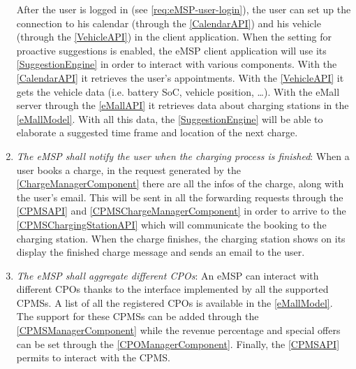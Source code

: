 \begin{enumerate}[label=\textbf{R\arabic*}]
            After the user is logged in (see \ref{req:eMSP-user-login}), the user can set up the connection to his calendar (through the \ref{CalendarAPI}) and his vehicle (through the \ref{VehicleAPI}) in the client application.
            When the setting for proactive suggestions is enabled, the \ac{eMSP} client application will use its \ref{SuggestionEngine} in order to interact with various components. With the \ref{CalendarAPI} it retrieves the user's appointments. With the \ref{VehicleAPI} it gets the vehicle data (i.e. battery \ac{SoC}, vehicle position, \ldots). With the \ac{eMall} server through the \ref{eMallAPI} it retrieves data about charging stations in the \ref{eMallModel}.
            With all this data, the \ref{SuggestionEngine} will be able to elaborate a suggested time frame and location of the next charge.
            \label{req:eMSP-proactive-suggestions}
      \item \textit{The \ac{eMSP} shall notify the user when the charging process is finished}:
            When a user books a charge, in the request generated by the \ref{ChargeManagerComponent} there are all the infos of the charge, along with the user's email. This will be sent in all the forwarding requests through the \ref{CPMSAPI} and \ref{CPMSChargeManagerComponent} in order to arrive to the \ref{CPMSChargingStationAPI} which will communicate the booking to the charging station.
            When the charge finishes, the charging station shows on its display the finished charge message and sends an email to the user.
            \label{req:eMSP-notification}
      \item \textit{The \ac{eMSP} shall aggregate different \acp{CPO}}:
            An \ac{eMSP} can interact with different \acp{CPO} thanks to the interface implemented by all the supported \acp{CPMS}.
            A list of all the registered \acp{CPO} is available in the \ref{eMallModel}.
            The support for these \acp{CPMS} can be added through the \ref{CPMSManagerComponent} while the revenue percentage and special offers can be set through the \ref{CPOManagerComponent}.
            Finally, the \ref{CPMSAPI} permits to interact with the \ac{CPMS}.

\end{enumerate}
